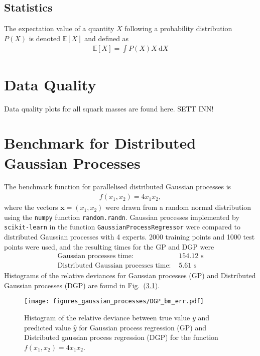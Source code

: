 \documentclass[twoside,english]{uiofysmaster}
\begin{document}
{\begin{appendices}
\section{Statistics}

The expectation value of a quantity $X$ following a probability distribution $P(X)$ is denoted $\mathbb{E}[X]$ and defined as 
\begin{align}
\mathbb{E}[X] = \int P(X)X~\mathrm{d} X
\end{align}
 
\chapter{Data Quality}\label{App: Quality Plots}

Data quality plots for all squark masses are found here. SETT INN!

\chapter{Benchmark for Distributed Gaussian Processes}

The benchmark function for parallelised distributed Gaussian processes is
\begin{align*}
f(x_1, x_2) =  4x_1x_2,
\end{align*}
where the vectors $\textbf{x} = (x_1, x_2)$ were drawn from a random normal distribution using the \verb|numpy| function \verb|random.randn|. Gaussian processes implemented by \verb|scikit-learn| in the function \verb|GaussianProcessRegressor| were compared to distributed Gaussian processes with 4 experts. 2000 training points and 1000 test points were used, and the resulting times for the GP and DGP were
\begin{align}
\text{Gaussian processes time: }& 154.12 \text{ s}\\
\text{Distributed Gaussian processes time: }& 5.61 \text{ s}
\end{align}
Histograms of the relative deviances for Gaussian processes (GP) and Distributed Gaussian processes (DGP) are found in Fig.\ (\ref{Fig:: gaussian process : DGP BM error histogram}).

\begin{figure}
\centering
\texttt{[image: figures\_gaussian\_processes/DGP\_bm\_err.pdf]}
\caption{Histogram of the relative deviance between true value $y$ and predicted value $\hat{y}$ for Gaussian process regression (GP) and Distributed gaussian process regression (DGP) for the function $f(x_1,x_2) = 4x_1 x_2$.}
\label{Fig:: gaussian process : DGP BM error histogram}
\end{figure}


\end{appendices}}
\end{document}
